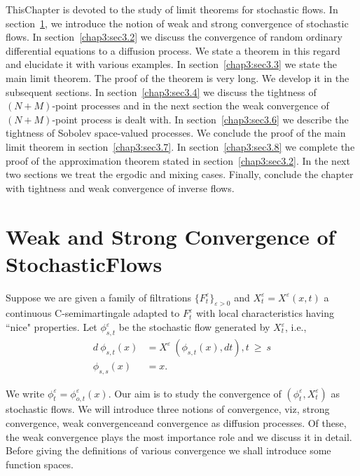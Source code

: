 This\pageoriginale Chapter is devoted to the study of limit theorems for stochastic
flows. In section~\ref{chap3:sec3.1}, we introduce the notion of weak and strong
convergence of stochastic flows. In section~\ref{chap3:sec3.2} we discuss the
convergence of random ordinary differential equations to a diffusion
process. We state a theorem in this regard and elucidate it with
various examples. In section~\ref{chap3:sec3.3} we state the main limit
theorem. The proof of the theorem is very long. We develop it in the
subsequent sections. In section~\ref{chap3:sec3.4} we discuss the tightness of
$(N+M)$-point processes and in the next section the weak convergence
of $(N+M)$-point process is dealt with. In section~\ref{chap3:sec3.6} we describe
the tightness of Sobolev space-valued processes. We conclude the proof
of the main limit theorem in section~\ref{chap3:sec3.7}. In section~\ref{chap3:sec3.8} we
complete the proof of the approximation theorem stated in 
section~\ref{chap3:sec3.2}. In the next two sections we treat the ergodic and mixing
cases. Finally, conclude the chapter with tightness and weak
convergence of inverse flows. 


\section[Weak and Strong Convergence of...]{Weak and Strong Convergence of Stochastic\hfill\break Flows}\label{chap3:sec3.1} %

Suppose we are given a family of filtrations $\{
F_t^\varepsilon\}_{\varepsilon > 0}$ and $X^\varepsilon_t =
X^\varepsilon (x,t)$ a continuous C-semimartingale adapted to
$F^\varepsilon_t$ with local characteristics having ``nice"
properties. Let $\phi^\varepsilon_{s,t}$ be the stochastic flow
generated by $X^\varepsilon_t$, i.e.,  
\begin{align*} 
  d ~ \phi_{s,t}(x) & = X^\varepsilon ~ (\phi_{s,t}(x),dt),t ~ \ge ~s\\
  \phi_{s,s}(x) & = x.
\end{align*}


We write $\phi_t^\varepsilon = \phi_{o,t}^\varepsilon (x)$. Our aim is
to study the convergence of $(\phi_t^\varepsilon,X^\varepsilon_t)$ as
stochastic flows. We will introduce three notions of convergence,
viz, strong convergence, weak convergence\pageoriginale and convergence as diffusion
processes. Of these, the weak convergence plays the most importance
role and we discuss it in detail. Before giving the definitions of
various convergence  we shall introduce some function spaces. 


